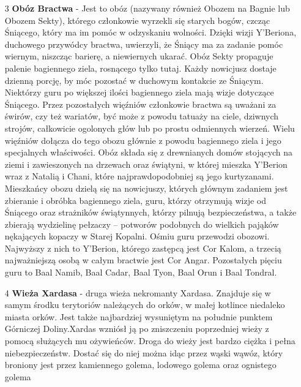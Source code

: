 \documentclass[11pt,polish, openany]{book}
\begin{document}
\begin{itemize}
    \item [3] \textbf{Obóz Bractwa} - Jest to obóz (nazywany również Obozem na Bagnie lub Obozem Sekty), którego członkowie wyrzekli się starych bogów, czcząc Śniącego, który ma im pomóc w odzyskaniu wolności. Dzięki wizji Y'Beriona, duchowego przywódcy bractwa, uwierzyli, że Śniący ma za zadanie pomóc wiernym, niszcząc barierę, a niewiernych ukarać. Obóz Sekty propaguje palenie bagiennego ziela, rosnącego tylko tutaj. Każdy nowicjusz dostaje dzienną porcję, by móc pozostać w duchowym kontakcie ze Śniącym. Niektórzy guru po większej ilości bagiennego ziela mają wizje dotyczące Śniącego. Przez pozostałych więźniów członkowie bractwa są uważani za świrów, czy też wariatów, być może z powodu tatuaży na ciele, dziwnych strojów, całkowicie ogolonych głów lub po prostu odmiennych wierzeń. Wielu więźniów dołącza do tego obozu głównie z powodu bagiennego ziela i jego specjalnych właściwości. Obóz składa się z drewnianych domów stojących na ziemi i zawieszonych na drzewach oraz świątyni, w której mieszka Y'Berion wraz z Natalią i Chani, które najprawdopodobniej są jego kurtyzanami. Mieszkańcy obozu dzielą się na nowicjuszy, których głównym zadaniem jest zbieranie i obróbka bagiennego ziela, guru, którzy otrzymują wizje od Śniącego oraz strażników świątynnych, którzy pilnują bezpieczeństwa, a także zbierają wydzielinę pełzaczy – potworów podobnych do wielkich pająków nękających kopaczy w Starej Kopalni. Ośmiu guru przewodzi obozowi. Najwyższy z nich to Y'Berion, którego zastępcą jest Cor Kalom, a trzecią najważniejszą osobą w całym bractwie jest Cor Angar. Pozostałych pięciu guru to Baal Namib, Baal Cadar, Baal Tyon, Baal Orun i Baal Tondral.
    \item [4] \textbf{Wieża Xardasa} - druga wieża nekromanty Xardasa. Znajduje się w samym środku terytoriów należących do orków, w małej kotlince niedaleko miasta orków. Jest także najbardziej wysuniętym na południe punktem Górniczej Doliny.Xardas wzniósł ją po zniszczeniu poprzedniej wieży z pomocą służących mu ożywieńców. Droga do wieży jest bardzo ciężka i pełna niebezpieczeństw. Dostać się do niej można idąc przez wąski wąwóz, który broniony jest przez kamiennego golema, lodowego golema oraz ognistego golema
\end{itemize}
\end{document}
